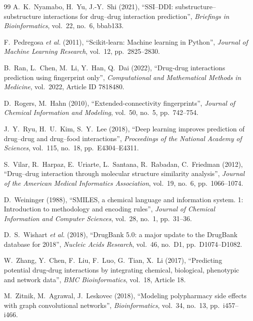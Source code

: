 \documentclass[12pt,a4paper,oneside]{report}
\begin{document}
\begin{thebibliography}{99}
A.~K.~Nyamabo, H.~Yu, J.-Y.~Shi (2021), ``SSI--DDI: substructure--substructure
interactions for drug--drug interaction prediction'', \textit{Briefings in
Bioinformatics}, vol.~22, no.~6, bbab133.

F.~Pedregosa \textit{et al.} (2011), ``Scikit-learn: Machine learning in
Python'', \textit{Journal of Machine Learning Research}, vol.~12,
pp.~2825--2830.

B.~Ran, L.~Chen, M.~Li, Y.~Han, Q.~Dai (2022), ``Drug-drug interactions
prediction using fingerprint only'', \textit{Computational and Mathematical
Methods in Medicine}, vol.~2022, Article ID 7818480.

D.~Rogers, M.~Hahn (2010), ``Extended-connectivity fingerprints'',
\textit{Journal of Chemical Information and Modeling}, vol.~50, no.~5,
pp.~742--754.

J.~Y.~Ryu, H.~U.~Kim, S.~Y.~Lee (2018), ``Deep learning improves prediction of
drug--drug and drug--food interactions'', \textit{Proceedings of the National
Academy of Sciences}, vol.~115, no.~18, pp.~E4304--E4311.

S.~Vilar, R.~Harpaz, E.~Uriarte, L.~Santana, R.~Rabadan, C.~Friedman (2012),
``Drug--drug interaction through molecular structure similarity analysis'',
\textit{Journal of the American Medical Informatics Association}, vol.~19,
no.~6, pp.~1066--1074.

D.~Weininger (1988), ``SMILES, a chemical language and information system.
1: Introduction to methodology and encoding rules'', \textit{Journal of Chemical
Information and Computer Sciences}, vol.~28, no.~1, pp.~31--36.

D.~S.~Wishart \textit{et al.} (2018), ``DrugBank 5.0: a major update to the
DrugBank database for 2018'', \textit{Nucleic Acids Research}, vol.~46,
no.~D1, pp.~D1074--D1082.

W.~Zhang, Y.~Chen, F.~Liu, F.~Luo, G.~Tian, X.~Li (2017), ``Predicting
potential drug-drug interactions by integrating chemical, biological,
phenotypic and network data'', \textit{BMC Bioinformatics}, vol.~18,
Article 18.

M.~Zitnik, M.~Agrawal, J.~Leskovec (2018), ``Modeling polypharmacy side effects
with graph convolutional networks'', \textit{Bioinformatics}, vol.~34, no.~13,
pp.~i457--i466.

\end{thebibliography}
\end{document}
